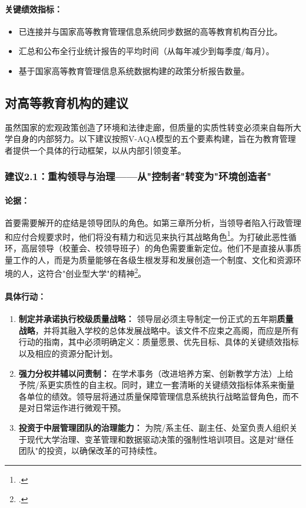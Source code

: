 \paragraph{关键绩效指标：}
\begin{itemize}
    \item 已连接并与国家高等教育管理信息系统同步数据的高等教育机构百分比。
    \item 汇总和公布全行业统计报告的平均时间（从每年减少到每季度/每月）。
    \item 基于国家高等教育管理信息系统数据构建的政策分析报告数量。
\end{itemize}

\subsection{对高等教育机构的建议}
\label{subsec:khuyen_nghi_csgddh_detailed}

虽然国家的宏观政策创造了环境和法律走廊，但质量的实质性转变必须来自每所大学自身的内部努力。以下建议按照V-AQA模型的五个要素构建，旨在为教育管理者提供一个具体的行动框架，以从内部引领变革。

\subsubsection{建议2.1：重构领导与治理——从"控制者"转变为"环境创造者"}

\paragraph{论据：}
首要需要解开的症结是领导团队的角色。如第三章所分析，当领导者陷入行政管理和应付合规要求时，他们将没有精力和远见来执行其战略角色\footcite{lypham_aosat_2024}。为打破此恶性循环，高层领导（校董会、校领导班子）的角色需要重新定位。他们不是直接从事质量工作的人，而是为质量能够在各级生根发芽和发展创造一个制度、文化和资源环境的人，这符合"创业型大学"的精神\footcite{clark_1998}。

\paragraph{具体行动：}
\begin{enumerate}
    \item \textbf{制定并承诺执行校级质量战略：} 领导层必须主导制定一份正式的五年期\textbf{质量战略}，并将其融入学校的总体发展战略中。该文件不应束之高阁，而应是所有行动的指南，其中必须明确定义：质量愿景、优先目标、具体的关键绩效指标以及相应的资源分配计划。
    \item \textbf{强力分权并辅以问责制：} 在学术事务（改进培养方案、创新教学方法）上给予院/系更实质性的自主权。同时，建立一套清晰的关键绩效指标体系来衡量各单位的绩效。领导层将通过质量保障管理信息系统执行战略监督角色，而不是对日常运作进行微观干预。
    \item \textbf{投资于中层管理团队的治理能力：} 为院/系主任、副主任、处室负责人组织关于现代大学治理、变革管理和数据驱动决策的强制性培训项目。这是对"继任团队"的投资，以确保改革的可持续性。
\end{enumerate}

